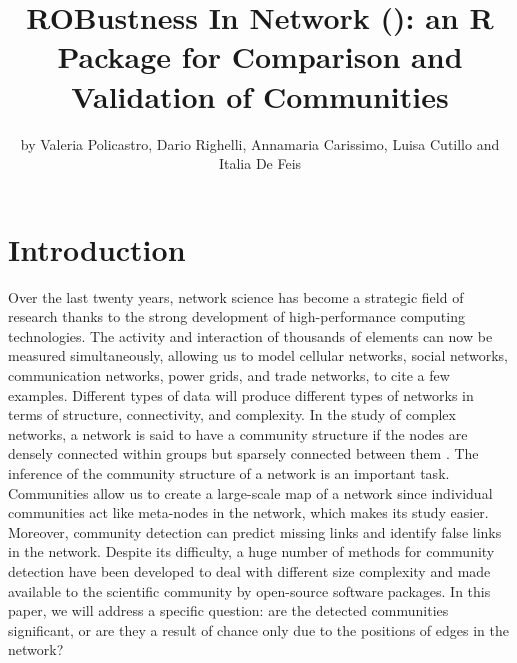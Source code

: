 \title{ROBustness In Network (): an R Package for Comparison and Validation of Communities }

\author{by Valeria Policastro, Dario Righelli, Annamaria Carissimo, Luisa Cutillo and Italia De Feis}

\maketitle



\section{Introduction} \label{sec:intro}

Over the last twenty years, network science has become a strategic field of research thanks to the strong development of high-performance computing technologies. The activity and interaction of thousands of elements can now be measured simultaneously, allowing us to model cellular networks, social networks, communication networks, power grids, and trade networks, to cite a few examples. Different types of data will produce different types of networks in terms of structure, connectivity, and complexity. In the study of complex networks, a network is said to have a community structure if the nodes are densely connected within groups but sparsely connected between them \citep{GirvanNewman:2002}. 
The inference of the community structure of a network is an important task. Communities allow us to create a large-scale map of a network since individual communities act like meta-nodes in the network, which makes its study easier. Moreover, community detection can predict missing links and identify false links in the network. Despite its difficulty, a huge number of methods for community detection have been developed to deal with different size complexity and made available to the scientific community by open-source software packages. In this paper, we will address a specific question: are the detected communities significant, or are they a result of chance only due to the positions of edges in the network?

